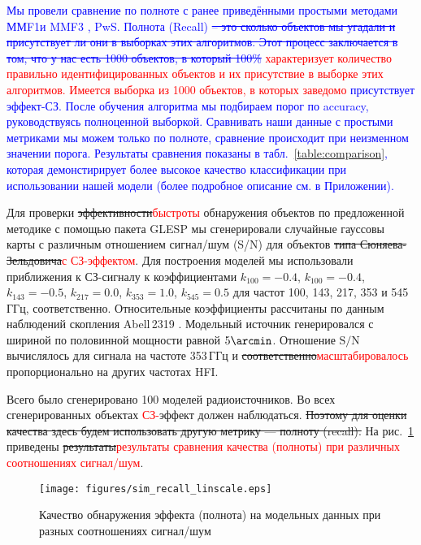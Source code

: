 \documentclass[
aps,%
12pt,%
final,%
notitlepage,%
oneside,%
onecolumn,%
nobibnotes,%
nofootinbib,%
superscriptaddress,%
noshowpacs,%
centertags]%
{revtex4}
\begin{document}
\textcolor{blue}{Мы провели сравнение по полноте с ранее приведёнными простыми методами ММF1и MMF3 \cite{Melin, Herranz}, PwS. Полнота (Recall) \sout{ -- это сколько объектов мы угадали и присутствует ли они в выборках этих алгоритмов. Этот процесс заключается в том, что у нас есть 1000 объектов, в который 100\%} \textcolor{red}{характеризует количество правильно идентифицированных объектов и их присутствие в выборке этих алгоритмов. Имеется выборка из 1000 объектов, в которых заведомо} присутствует эффект-СЗ. После обучения алгоритма мы подбираем порог по accuracy, руководствуясь полноценной выборкой. Сравнивать наши данные с простыми метриками мы можем только по полноте, сравнение происходит при неизменном значении порога. Результаты сравнения показаны в табл.~\ref{table:comparison}, которая демонстирирует более высокое качество классификации при использовании нашей модели (более подробное описание см. в Приложении).}

Для проверки \sout{эффективности}\textcolor{red}{быстроты} обнаружения объектов по предложенной методике с помощью пакета GLESP \cite{glesp1} мы сгенерировали случайные гауссовы карты с различным отношением сигнал/шум (S/N) для объектов \sout{типа Сюняева-Зельдовича}\textcolor{red}{с СЗ-эффектом}.
Для построения моделей мы использовали приближения к СЗ-сигналу к коэффициентами $k_{100}=-0.4$, $k_{100}=-0.4$, $k_{143}=-0.5$, $k_{217}=0.0$, $k_{353}=1.0$, $k_{545}=0.5$ для частот 100, 143, 217, 353 и 545\,ГГц, соответственно. Относительные коэффициенты рассчитаны по данным наблюдений скопления Abell\,2319 \cite{Abell, Planck1, Planck2}. Модельный источник генерировался с шириной по половинной мощности равной $5\arcmin$. Отношение $\text{S}/\text{N}$ вычислялось для сигнала на частоте 353\,ГГц и \sout{соответственно}\textcolor{red}{масштабировалось} пропорционально на других частотах HFI. 


Всего было сгенерировано 100 моделей радиоисточников. Во всех сгенерированных объектах \textcolor{red}{СЗ-}эффект должен наблюдаться. \sout{Поэтому для оценки качества здесь будем использовать другую метрику --- полноту (recall).}
На рис.~\ref{fig:sim} приведены \sout{результаты}\textcolor{red}{результаты сравнения качества (полноты) при различных соотношениях сигнал/шум}. 

\begin{figure}[h!]
\onelinecaptionstrue
\setcaptionmargin{5mm}
\texttt{[image: figures/sim\_recall\_linscale.eps]}
\caption{Качество обнаружения эффекта (полнота) на модельных данных при разных соотношениях сигнал/шум}
\label{fig:sim}
\end{figure}
\end{document}
